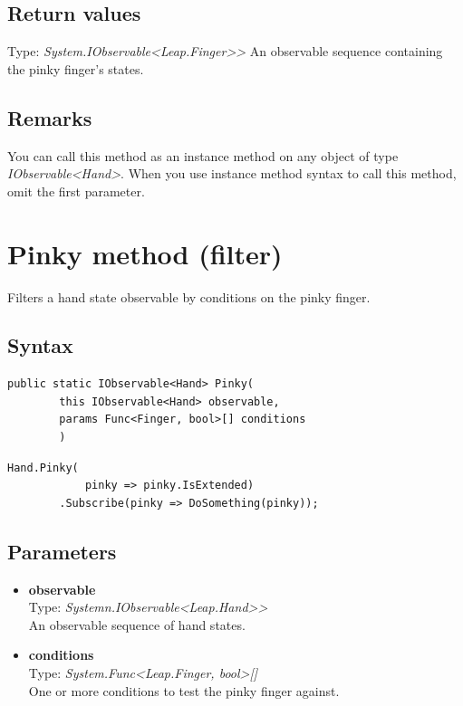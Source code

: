 \documentclass[12pt,a4paper,twoside]{report}
\begin{document}
\subsection{Return values}
Type: \textit{System.IObservable<Leap.Finger>{}>}
An observable sequence containing the pinky finger's states.

\subsection{Remarks}
You can call this method as an instance method on any object of type \textit{IObservable<Hand>}. When you use 
instance method syntax to call this method, omit the first parameter.

\newpage

\section{Pinky method (filter)}
Filters a hand state observable by conditions on the pinky finger.

\subsection{Syntax}
\begin{lstlisting}[caption=Declaration]
    public static IObservable<Hand> Pinky(
        this IObservable<Hand> observable,
        params Func<Finger, bool>[] conditions
        )
\end{lstlisting}

\begin{lstlisting}[caption=Usage example]
    Hand.Pinky(
            pinky => pinky.IsExtended)
        .Subscribe(pinky => DoSomething(pinky));
\end{lstlisting}

\subsection{Parameters}

\begin{itemize}
    \item \textbf{observable}\\
        Type: \textit{Systemn.IObservable<Leap.Hand>{}>}\\
        An observable sequence of hand states.
    \item \textbf{conditions}\\
        Type: \textit{System.Func<Leap.Finger, bool>[]}\\
        One or more conditions to test the pinky finger against.
\end{itemize}
\end{document}
